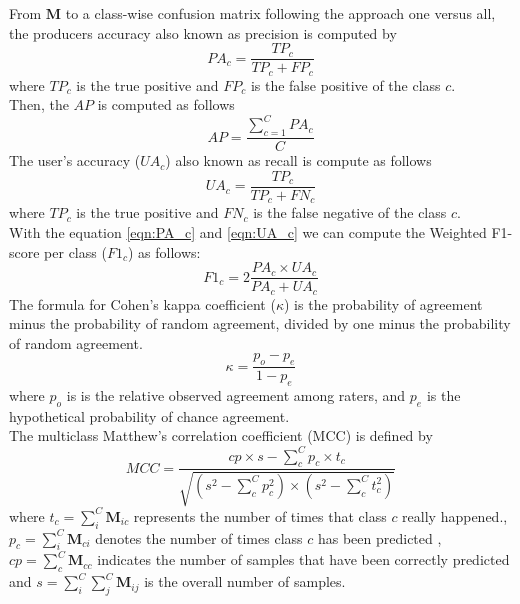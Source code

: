 \documentclass[journal,article,submit,pdftex,moreauthors]{Definitions/mdpi}
\begin{document}
From $\mathbf{M}$ to a class-wise confusion matrix following the approach one versus all, the producers accuracy also known as precision is computed by \\
\begin{equation}
	\label{eqn:PA_c}
	PA_c = \frac{TP_c}{TP_c + FP_c}
\end{equation}
where $TP_c$ is the true positive and $FP_c$ is the false positive of the class $c$. \\
Then, the $AP$ is computed as follows
\begin{equation}
	\label{eqn:AA}
	AP = \frac{\sum_{c=1}^{C} PA_c}{C}
\end{equation}
The user's accuracy ($UA_c$) also known as recall is compute as follows
\begin{equation}
	\label{eqn:UA_c}
	UA_c = \frac{TP_c}{TP_c + FN_c}
\end{equation}
where $TP_c$ is the true positive and $FN_c$ is the false negative of the class $c$.\\
With the equation \ref{eqn:PA_c} and \ref{eqn:UA_c} we can compute the Weighted F1-score per class ($F1_c$) as follows:
\begin{equation}
	\label{eqn:F1_c}
	F1_c = 2 \frac{PA_c \times UA_c}{PA_c + UA_c}
\end{equation}
The formula for Cohen’s kappa coefficient ($\kappa$) is the probability of agreement minus the probability of random agreement, divided by one minus the probability of random agreement.\\
\begin{equation}
	\label{eqn:k}
	\kappa= \frac{p_o - p_e}{1 - p_e}
\end{equation}
where $p_o$ is is the relative observed agreement among raters, and $p_e$ is the hypothetical probability of chance agreement.\\
The multiclass Matthew's correlation coefficient (MCC) is defined by
\begin{equation}
    MCC = \frac{cp \times s - \sum^{C}_{c} p_{c} \times t_{c} }{\sqrt{( s^{2} - \sum^{C}_{c} p^{2}_{c}) \times (s^{2} - \sum^{C}_{c} t^{2}_{c})}}
\end{equation}
where $t_{c} = \sum^{C}_{i} \mathbf{M}_{ic}$ represents the number of times that class $c$ really happened., $p_{c} = \sum^{C}_{i} \mathbf{M}_{ci}$ denotes the number of times class $c$ has been predicted , $cp = \sum^{C}_{c} \mathbf{M}_{cc}$ indicates the number of samples that have been correctly predicted and $s= \sum^{C}_{i} \sum^{C}_{j} \mathbf{M}_{ij}$ is the overall number of samples.
\end{document}
